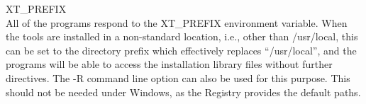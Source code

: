 \begin{description}
%
%
%
%
%

\item{\et XT\_PREFIX}\\
All of the {\XicTools} programs respond to the {\et XT\_PREFIX}
environment variable.  When the tools are installed in a non-standard
location, i.e., other than {\vt /usr/local}, this can be set to the
directory prefix which effectively replaces ``{\vt /usr/local}'', and
the programs will be able to access the installation library files
without further directives.  The {\Xic} {\et -R} command line option
can also be used for this purpose.  This should not be needed under
Windows, as the Registry provides the default paths.


\end{description}
